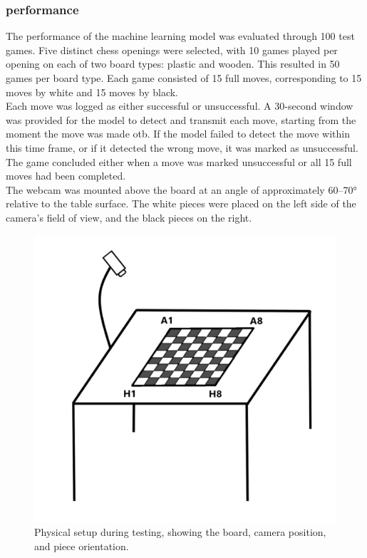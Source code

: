 \subsubsection*{performance}
The performance of the machine learning model was evaluated through 100 test games. Five distinct chess openings were selected, with 10 games played per opening on each of two board types: plastic and wooden. This resulted in 50 games per board type. Each game consisted of 15 full moves, corresponding to 15 moves by white and 15 moves by black. \\

Each move was logged as either successful or unsuccessful. A 30-second window was provided for the model to detect and transmit each move, starting from the moment the move was made \gls{otb}. If the model failed to detect the move within this time frame, or if it detected the wrong move, it was marked as unsuccessful. The game concluded either when a move was marked unsuccessful or all 15 full moves had been completed. \\

The webcam was mounted above the board at an angle of approximately 60–70\si{\degree} relative to the table surface. The white pieces were placed on the left side of the camera's field of view, and the black pieces on the right.

\begin{figure}[h!]
    \centering
    \includegraphics[width=0.75\linewidth]{figures/methods/testing/setup.png}
    \caption[Setup during testing]{Physical setup during testing, showing the board, camera position, and piece orientation.}
    \label{fig:setup}
\end{figure}



